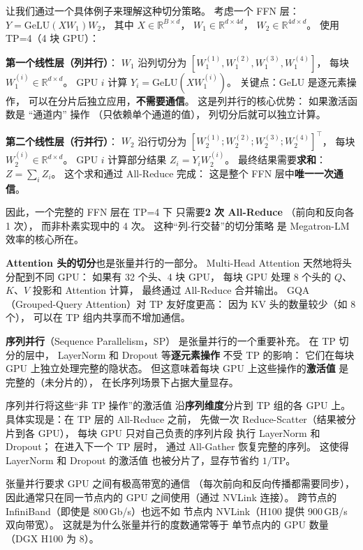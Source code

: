 让我们通过一个具体例子来理解这种切分策略。
考虑一个 FFN 层：$Y = \mathrm{GeLU}(XW_1) W_2$，
其中 $X \in \mathbb{R}^{B \times d}$，
$W_1 \in \mathbb{R}^{d \times 4d}$，
$W_2 \in \mathbb{R}^{4d \times d}$。
使用 TP=4（4 块 GPU）：

\textbf{第一个线性层（列并行）}：
$W_1$ 沿列切分为 $[W_1^{(1)}, W_1^{(2)}, W_1^{(3)}, W_1^{(4)}]$，
每块 $W_1^{(i)} \in \mathbb{R}^{d \times d}$。
GPU $i$ 计算 $Y_i = \mathrm{GeLU}(X W_1^{(i)})$。
关键点：GeLU 是逐元素操作，
可以在分片后独立应用，\textbf{不需要通信}。
这是列并行的核心优势：
如果激活函数是 “通道内” 操作
（只依赖单个通道的值），
列切分后就可以独立计算。

\textbf{第二个线性层（行并行）}：
$W_2$ 沿行切分为 $[W_2^{(1)}; W_2^{(2)}; W_2^{(3)}; W_2^{(4)}]^\top$，
每块 $W_2^{(i)} \in \mathbb{R}^{d \times d}$。
GPU $i$ 计算部分结果 $Z_i = Y_i W_2^{(i)}$。
最终结果需要\textbf{求和}：$Z = \sum_i Z_i$。
这个求和通过 All-Reduce 完成：
这是整个 FFN 层中\textbf{唯一一次通信}。

因此，一个完整的 FFN 层在 TP=4 下
只需要\textbf{2 次 All-Reduce}
（前向和反向各 1 次），
而非朴素实现中的 4 次。
这种“列-行交替”的切分策略
是 Megatron-LM 效率的核心所在。

\textbf{Attention 头的切分}也是张量并行的一部分。
Multi-Head Attention 天然地将头分配到不同 GPU：
如果有 32 个头、4 块 GPU，
每块 GPU 处理 8 个头的 $Q$、$K$、$V$ 投影和 Attention 计算，
最终通过 All-Reduce 合并输出。
GQA（Grouped-Query Attention）对 TP 友好度更高：
因为 KV 头的数量较少（如 8 个），
可以在 TP 组内共享而不增加通信。

\textbf{序列并行}（Sequence Parallelism，SP）
是张量并行的一个重要补充。
在 TP 切分的层中，
LayerNorm 和 Dropout 等\textbf{逐元素操作}
不受 TP 的影响：
它们在每块 GPU 上独立处理完整的隐状态。
但这意味着每块 GPU 上这些操作的\textbf{激活值}
是完整的（未分片的），
在长序列场景下占据大量显存。

序列并行将这些“非 TP 操作”的激活值
沿\textbf{序列维度}分片到 TP 组的各 GPU 上。
具体实现是：在 TP 层的 All-Reduce 之前，
先做一次 Reduce-Scatter（结果被分片到各 GPU），
每块 GPU 只对自己负责的序列片段
执行 LayerNorm 和 Dropout；
在进入下一个 TP 层时，
通过 All-Gather 恢复完整的序列。
这使得 LayerNorm 和 Dropout 的激活值
也被分片了，显存节省约 $1/\mathrm{TP}$。

张量并行要求 GPU 之间有极高带宽的通信
（每次前向和反向传播都需要同步），
因此通常只在同一节点内的 GPU 之间使用（通过 NVLink 连接）。
跨节点的 InfiniBand（即使是 800\,Gb/s）也远不如
节点内 NVLink（H100 提供 900\,GB/s 双向带宽）。
这就是为什么张量并行的度数通常等于
单节点内的 GPU 数量（DGX H100 为 8）。

